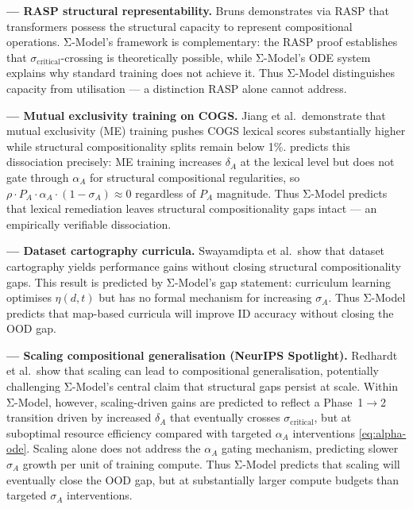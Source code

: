 \documentclass[10pt]{article}
\begin{document}
\textbf{\cite{bruns2025exploringcompositionalgeneralizationin} --- RASP structural representability.}
Bruns demonstrates via RASP that transformers possess the structural capacity
to represent compositional operations. Σ-Model's framework is
complementary: the RASP proof establishes that
$\sigma_{\text{critical}}$-crossing is theoretically possible, while
Σ-Model's ODE system explains why standard training does not achieve it.
Thus Σ-Model distinguishes capacity from utilisation --- a distinction
RASP alone cannot address.

\textbf{\cite{jiang2022mutualexclusivity} --- Mutual exclusivity training on COGS.}
Jiang et al.\ demonstrate that mutual exclusivity (ME) training pushes
COGS lexical scores substantially higher while structural
compositionality splits remain below 1\%. %
predicts this dissociation precisely: ME training increases
$\delta_A$ at the lexical level but does not gate through $\alpha_A$
for structural compositional regularities, so
$\rho \cdot P_A \cdot \alpha_A \cdot (1 - \sigma_A) \approx 0$
regardless of $P_A$ magnitude.
Thus Σ-Model predicts that lexical remediation leaves structural
compositionality gaps intact --- an empirically verifiable dissociation.

\textbf{\cite{swayamdipta2020datasetcartography} --- Dataset cartography curricula.}
Swayamdipta et al.\ show that dataset cartography yields performance
gains without closing structural compositionality gaps. This result is
predicted by Σ-Model's gap statement: curriculum learning optimises
$\eta(d,t)$ but has no formal mechanism for increasing $\sigma_A$.
Thus Σ-Model predicts that map-based curricula will improve ID
accuracy without closing the OOD gap.

\textbf{\cite{redhardt2025} --- Scaling compositional generalisation (NeurIPS Spotlight).}
Redhardt et al.~show that scaling can lead to compositional generalisation,
potentially challenging Σ-Model's central claim that structural gaps persist at
scale. Within Σ-Model, however, scaling-driven gains are predicted to reflect a
Phase~1$\to$2 transition driven by increased $\delta_A$ that eventually crosses
$\sigma_{\text{critical}}$, but at suboptimal resource efficiency compared with
targeted $\alpha_A$ interventions \eqref{eq:alpha-ode}. Scaling alone does not
address the $\alpha_A$ gating mechanism, predicting slower $\sigma_A$ growth per
unit of training compute.
Thus Σ-Model predicts that scaling will eventually close the OOD gap, but at
substantially larger compute budgets than targeted $\sigma_A$ interventions.
\end{document}
